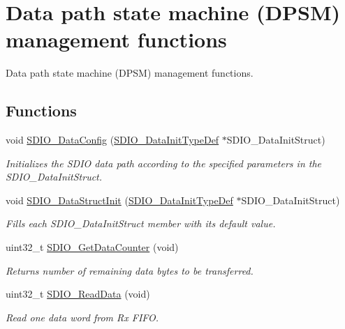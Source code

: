 \hypertarget{group___s_d_i_o___group3}{}\section{Data path state machine (D\+P\+S\+M) management functions}
\label{group___s_d_i_o___group3}


Data path state machine (D\+P\+S\+M) management functions.  


\subsection*{Functions}
\begin{DoxyCompactItemize}
\item 
void \hyperlink{group___s_d_i_o___group3_gad65d896ae919683585bda44a1e2afae4}{S\+D\+I\+O\+\_\+\+Data\+Config} (\hyperlink{struct_s_d_i_o___data_init_type_def}{S\+D\+I\+O\+\_\+\+Data\+Init\+Type\+Def} $\ast$S\+D\+I\+O\+\_\+\+Data\+Init\+Struct)
\begin{DoxyCompactList}\small\item\em Initializes the S\+D\+I\+O data path according to the specified parameters in the S\+D\+I\+O\+\_\+\+Data\+Init\+Struct. \end{DoxyCompactList}\item 
void \hyperlink{group___s_d_i_o___group3_gaa83209c09e921521aca2587fb5b22ea2}{S\+D\+I\+O\+\_\+\+Data\+Struct\+Init} (\hyperlink{struct_s_d_i_o___data_init_type_def}{S\+D\+I\+O\+\_\+\+Data\+Init\+Type\+Def} $\ast$S\+D\+I\+O\+\_\+\+Data\+Init\+Struct)
\begin{DoxyCompactList}\small\item\em Fills each S\+D\+I\+O\+\_\+\+Data\+Init\+Struct member with its default value. \end{DoxyCompactList}\item 
uint32\+\_\+t \hyperlink{group___s_d_i_o___group3_ga7a28aaa2c25a9a5a8db1f49b0e8c9d0a}{S\+D\+I\+O\+\_\+\+Get\+Data\+Counter} (void)
\begin{DoxyCompactList}\small\item\em Returns number of remaining data bytes to be transferred. \end{DoxyCompactList}\item 
uint32\+\_\+t \hyperlink{group___s_d_i_o___group3_ga4e8ac755ef3c31ecd4ed2708df19187e}{S\+D\+I\+O\+\_\+\+Read\+Data} (void)
\begin{DoxyCompactList}\small\item\em Read one data word from Rx F\+I\+F\+O. \end{DoxyCompactList}\item 

\end{DoxyCompactItemize}

